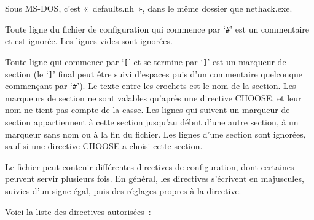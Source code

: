 \documentclass[titlepage]{article}
\begin{document}
Sous MS-DOS, c'est «~defaults.nh~», dans le même dossier que
nethack.exe.


Toute ligne du fichier de configuration qui commence par `\texttt{\#}'
est un commentaire et est ignorée.
Les lignes vides sont ignorées.


Toute ligne qui commence par `\texttt{[}' et se termine par
`\texttt{]}' est un marqueur de section (le `\texttt{]}' final peut
être suivi d'espaces puis d'un commentaire quelconque commençant par
`\texttt{\#}').
Le texte entre les crochets est le nom de la section.
Les marqueurs de section ne sont valables qu'après une directive CHOOSE, et
leur nom ne tient pas compte de la casse.
Les lignes qui suivent un marqueur de section appartiennent à cette section
jusqu'au début d'une autre section, à un marqueur sans nom ou à la fin du
fichier.
Les lignes d'une section sont ignorées, sauf si une directive CHOOSE a
choisi cette section.


Le fichier peut contenir différentes directives de configuration, dont
certaines peuvent servir plusieurs fois.
En général, les directives s'écrivent en majuscules, suivies d'un signe
égal, puis des réglages propres à la directive.


Voici la liste des directives autorisées~:
\end{document}
